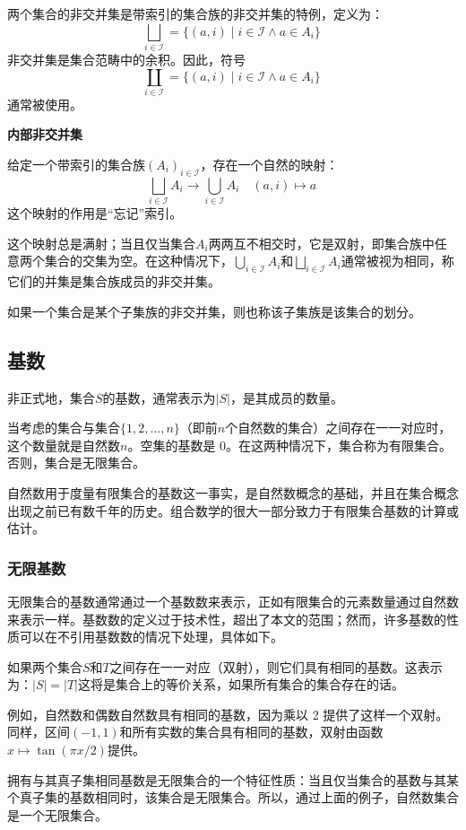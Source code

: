 两个集合的非交并集是带索引的集合族的非交并集的特例，定义为：
\[
\bigsqcup_{i \in \mathcal{I}} = \{(a, i) \mid i \in \mathcal{I} \land a \in A_i\}~
\]
非交并集是集合范畴中的余积。因此，符号
\[
\coprod_{i \in \mathcal{I}} = \{(a, i) \mid i \in \mathcal{I} \land a \in A_i\}~
\]
通常被使用。

\textbf{内部非交并集}

给定一个带索引的集合族\( (A_i)_{i \in \mathcal{I}} \)，存在一个自然的映射：
\[
\bigsqcup_{i \in \mathcal{I}} A_i \to \bigcup_{i \in \mathcal{I}} A_i
\quad (a, i) \mapsto a~
\]
这个映射的作用是“忘记”索引。

这个映射总是满射；当且仅当集合\( A_i \)两两互不相交时，它是双射，即集合族中任意两个集合的交集为空。在这种情况下，\( \bigcup_{i \in \mathcal{I}} A_i \)和\( \bigsqcup_{i \in \mathcal{I}} A_i \)通常被视为相同，称它们的并集是集合族成员的非交并集。

如果一个集合是某个子集族的非交并集，则也称该子集族是该集合的划分。
\subsection{基数}
非正式地，集合\( S \)的基数，通常表示为\( |S| \)，是其成员的数量。

当考虑的集合与集合\( \{1, 2, \dots, n\} \)（即前\( n \)个自然数的集合）之间存在一一对应时，这个数量就是自然数\( n \)。空集的基数是 0。在这两种情况下，集合称为有限集合。否则，集合是无限集合。

自然数用于度量有限集合的基数这一事实，是自然数概念的基础，并且在集合概念出现之前已有数千年的历史。组合数学的很大一部分致力于有限集合基数的计算或估计。
\subsubsection{无限基数}
无限集合的基数通常通过一个基数数来表示，正如有限集合的元素数量通过自然数来表示一样。基数数的定义过于技术性，超出了本文的范围；然而，许多基数的性质可以在不引用基数数的情况下处理，具体如下。

如果两个集合\( S \)和\( T \)之间存在一一对应（双射），则它们具有相同的基数。这表示为：\(|S| = |T|\)这将是集合上的等价关系，如果所有集合的集合存在的话。

例如，自然数和偶数自然数具有相同的基数，因为乘以 2 提供了这样一个双射。同样，区间\( (-1, 1) \)和所有实数的集合具有相同的基数，双射由函数\( x \mapsto \tan(\pi x / 2) \)提供。

拥有与其真子集相同基数是无限集合的一个特征性质：当且仅当集合的基数与其某个真子集的基数相同时，该集合是无限集合。所以，通过上面的例子，自然数集合是一个无限集合。

